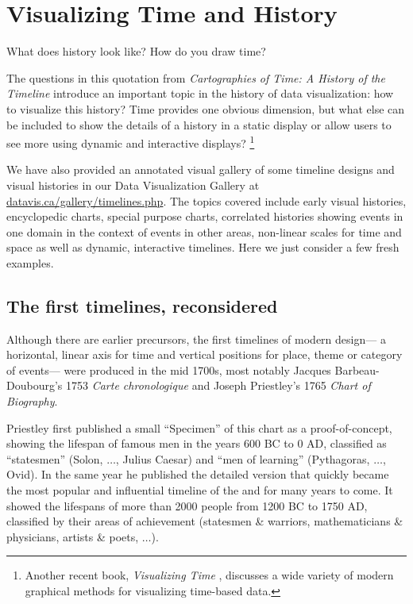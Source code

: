 \section{Visualizing Time and History}\label{sec:vistime}

\epigraph{What does history look like?  How do you draw time?}{\citet[p. 10]{RosenbergGrafton:2010}}
The questions in this quotation from \emph{Cartographies of Time: A History of the Timeline} \citep{RosenbergGrafton:2010}
introduce an important topic in the history of data visualization: how to visualize this history?
Time provides one obvious dimension, but what else can be included to show the details of a history in a static display
or allow users to see more using dynamic and interactive displays?%
\footnote{Another recent book, \emph{Visualizing Time}
\citet{Wills:2012}, discusses a wide variety of modern graphical methods for visualizing time-based data.
} 

We have also provided an annotated visual gallery of some timeline designs and visual histories
in our Data Visualization Gallery at \url{datavis.ca/gallery/timelines.php}. The topics covered
include early visual histories, encyclopedic charts, special purpose charts, correlated histories
showing events in one domain in the context of events in other areas, non-linear scales for
time and space as well as dynamic, interactive timelines.  Here we just consider a few fresh examples.

\subsection{The first timelines, reconsidered}
Although there are earlier precursors, the first timelines of modern design---
a horizontal, linear axis for time and vertical positions for place, theme or category of events---
were produced in the mid 1700s, most notably Jacques Barbeau-Doubourg's 1753
\emph{Carte chronologique} and Joseph Priestley's 1765 \emph{Chart of Biography}.

Priestley first published a small ``Specimen'' of this chart as a proof-of-concept,
showing the lifespan of famous men in the years 600 BC to 0 AD, classified as
``statesmen'' (Solon,  $\dots$, Julius Caesar) and ``men of learning'' (Pythagoras, $\dots$, Ovid).
In the same year he published the detailed version \citep{Priestley:1765}
 that quickly became the most popular
and influential timeline of the  and for many years to come.  It showed the
lifespans of more than 2000 people from 1200 BC to 1750 AD, classified by their areas
of achievement (statesmen \& warriors, mathematicians \& physicians, artists \& poets, $\dots$).

